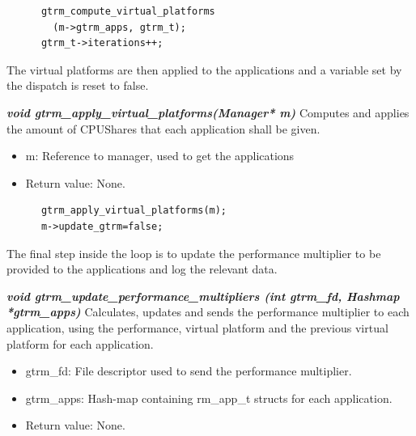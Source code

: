 \documentclass[nobiblatex]{LTHthesis}
\begin{document}
\begin{lstlisting}
      gtrm_compute_virtual_platforms
        (m->gtrm_apps, gtrm_t);
      gtrm_t->iterations++;
\end{lstlisting}

The virtual platforms are then applied to the applications and a variable set by the dispatch is reset to false.
\begin{framed}
	\begin{flushleft}
			\textbf{\emph{{void gtrm\_apply\_virtual\_platforms(Manager* m)}}}
      \newline
			Computes and applies the amount of CPUShares that each application 
        shall be given.
			\begin{itemize}
			\item m: Reference to manager, used to get the applications
			\item Return value: None.
			\end{itemize}
	\end{flushleft}	
\end{framed}
\begin{lstlisting}
      gtrm_apply_virtual_platforms(m); 
      m->update_gtrm=false;																	
\end{lstlisting}

The final step inside the loop is to update the performance multiplier to be
provided to the applications and log the relevant data.
\begin{framed}
	\begin{flushleft}
			\textbf{\emph{{void gtrm\_update\_performance\_multipliers \newline
      (int gtrm\_fd, Hashmap *gtrm\_apps)}}} \newline
			Calculates, updates and sends the performance multiplier to 
      each application, using the performance, virtual platform and 
      the previous virtual platform for each application.
			\begin{itemize} 
			\item gtrm\_fd: File descriptor used to send the performance 
        multiplier.
			\item gtrm\_apps: Hash-map containing rm\_app\_t structs for 
        each application.
			\item Return value: None.
			\end{itemize}
	\end{flushleft}	
\end{framed}
\end{document}

